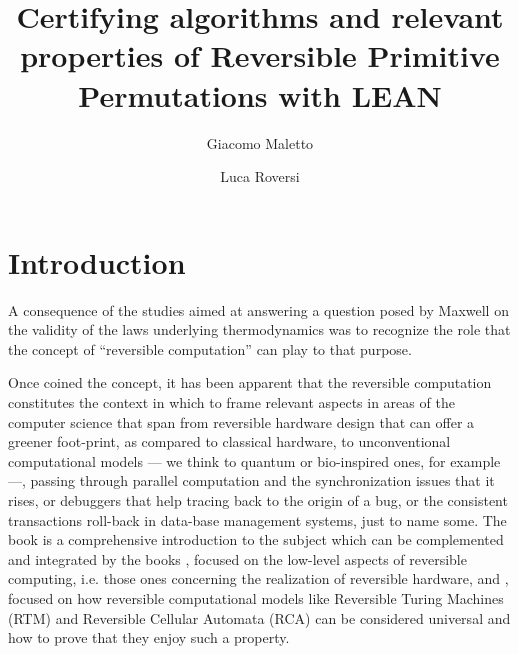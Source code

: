 \documentclass[runningheads]{llncs}
\newcommand{\LEAN}{\textsf{LEAN}\xspace}
\begin{document}
\title{Certifying algorithms and relevant properties of  Reversible Primitive Permutations with \LEAN}

\author{Giacomo Maletto \and
	    Luca Roversi}



\maketitle
\begin{abstract}
\end{abstract}

\section{Introduction}
\label{section:Introduction}

A consequence of the studies aimed at answering a question posed by Maxwell on the validity of the laws underlying thermodynamics was to recognize the role that the concept of ``reversible computation'' can play to that purpose.

Once coined the concept, it has been apparent that the reversible computation constitutes the context in which to frame relevant aspects in areas of the computer science that span from reversible hardware design that can offer a greener foot-print, as compared to classical hardware, to unconventional computational models --- we think to quantum or bio-inspired ones, for example ---, passing through parallel computation and the synchronization issues that it rises, or debuggers that help tracing back to the origin of a bug, or the consistent transactions roll-back in data-base management systems, just to name some. The book \cite{perumalla2013chc} is a comprehensive introduction to the subject which can be complemented and integrated by the books \cite{DBLP:books/daglib/0025734}, focused on the low-level aspects of reversible computing, i.e. those ones concerning the realization of reversible hardware, and
\cite{DBLP:series/eatcs/Morita17}, focused on how reversible computational models like Reversible Turing Machines (RTM) and Reversible Cellular Automata (RCA) can be considered universal and how to prove that they enjoy such a property.
\end{document}
